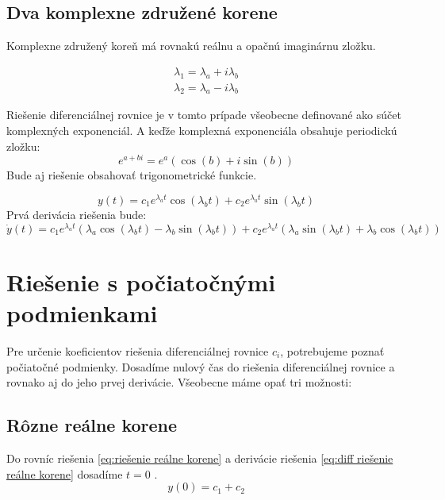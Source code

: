 \documentclass[a4paper,10pt]{article}
\begin{document}
\subsection{Dva komplexne združené korene}

Komplexne združený koreň má rovnakú reálnu a opačnú imaginárnu zložku.

\begin{equation}
  \begin{array}{l}
  	\lambda_1=\lambda_a+i \lambda_b \\
  	\lambda_2=\lambda_a-i \lambda_b
  \end{array}
\end{equation}

Riešenie diferenciálnej rovnice je v tomto prípade všeobecne definované ako súčet komplexných exponenciál.
A keďže komplexná exponenciála obsahuje periodickú zložku:
\begin{equation*}
 e^{a+bi}=e^a\left(\cos(b)+i\sin(b)\right)
\end{equation*}
Bude aj riešenie obsahovať trigonometrické funkcie.

\begin{equation}
\label{eq:riešenie komplexné korene}
  y(t)=c_1e^{\lambda_a t}\cos(\lambda_b t)+c_2e^{\lambda_a t}\sin(\lambda_b t)
\end{equation}
Prvá derivácia riešenia bude: 
\begin{equation}
\label{eq:diff riešenie komplexné korene}
 \dot{y}(t)=c_1 e^{\lambda_a t} \left( \lambda_a \cos(\lambda_b t)- \lambda_b \sin(\lambda_b t) \right) +
 c_2 e^{\lambda_a t} \left(\lambda_a \sin(\lambda_b t) + \lambda_b \cos(\lambda_b t)  \right) 
\end{equation}

\section{Riešenie s počiatočnými podmienkami}
Pre určenie koeficientov riešenia diferenciálnej rovnice $c_i$, potrebujeme poznať počiatočné podmienky.
Dosadíme nulový čas do riešenia diferenciálnej rovnice a rovnako aj do jeho prvej derivácie.
Všeobecne máme opať tri možnosti:


\subsection{Rôzne reálne korene}

Do rovníc riešenia \eqref{eq:riešenie reálne korene} a derivácie riešenia \eqref{eq:diff riešenie reálne korene} dosadíme $t=0$ .
\begin{equation}
	y(0)= c_1+c_2
\end{equation}
	
\end{document}
